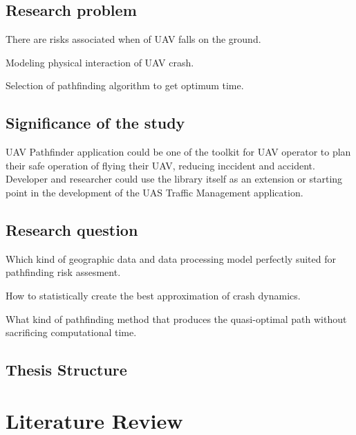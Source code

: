 \documentclass[12pt]{report}
\begin{document}
    \section{Research problem}
        \begin{myitemize}
            \item There are risks associated when of UAV falls on the ground.
            \item Modeling physical interaction of UAV crash.
            \item Selection of pathfinding algorithm to get optimum time.
        \end{myitemize}
        
    \section{Significance of the study}
        UAV Pathfinder application could be one of the toolkit for UAV operator to plan their safe operation of
        flying their UAV, reducing inccident and accident. Developer and researcher could use the library itself as an
        extension or starting point in the development of the \ac{UAS} Traffic Management application.
        
    \section{Research question}
        \begin{myitemize}
            \item Which kind of geographic data and data processing model perfectly suited for pathfinding risk assesment.  
            \item How to statistically create the best approximation of crash dynamics.
            \item What kind of pathfinding method that produces the quasi-optimal path without sacrificing computational time.
        \end{myitemize}

    \section{Thesis Structure}


\chapter{Literature Review}
\end{document}
